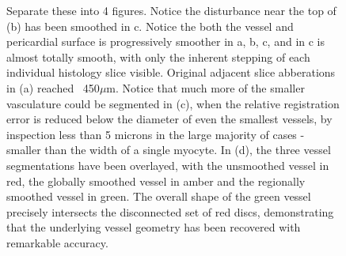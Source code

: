     \begin{figure}[p]
      \centering
      \caption{Separate these into 4 figures. Notice the disturbance near the top of (b) has been smoothed in c. Notice the both the vessel and pericardial surface is progressively smoother in a, b, c, and in c is almost totally smooth, with only the inherent stepping of each individual histology slice visible. Original adjacent slice abberations in (a) reached ~450$\mu$m. Notice that much more of the smaller vasculature could be segmented in (c), when the relative registration error is reduced below the diameter of even the smallest vessels, by inspection less than 5 microns in the large majority of cases - smaller than the width of a single myocyte. In (d), the three vessel segmentations have been overlayed, with the unsmoothed vessel in red, the globally smoothed vessel in amber and the regionally smoothed vessel in green. The overall shape of the green vessel precisely intersects the disconnected set of red discs, demonstrating that the underlying vessel geometry has been recovered with remarkable accuracy.}
      \label{fig:vessel_segmentations}
    \end{figure}
    
